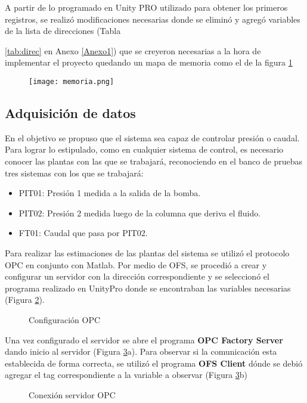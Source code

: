 
A partir de lo programado en Unity PRO utilizado para obtener los primeros registros, se realizó modificaciones necesarias donde se eliminó y agregó variables de la lista de direcciones (Tabla {\ref{tab:direc} en Anexo \ref{Anexo1}) que se creyeron necesarias a la hora de implementar el proyecto quedando un mapa de memoria como el de la figura \ref{fig:memoria}
\begin{figure}[h!]
	\centering
	\texttt{[image: memoria.png]}
	\label{fig:memoria}
\end{figure}


\subsection{Adquisición de datos}
En el objetivo se propuso que el sistema sea capaz de controlar presión o caudal. Para lograr lo estipulado, como en cualquier sistema de control, es necesario conocer las plantas con las que se trabajará, reconociendo en el banco de pruebas tres sistemas con los que se trabajará:
\begin{itemize}
	\item PIT01: Presión 1 medida a la salida de la bomba.
	\item PIT02: Presión 2 medida luego de la columna que deriva el fluido.
	\item FT01: Caudal que pasa por PIT02.
\end{itemize}
Para realizar las estimaciones de las plantas del sistema se utilizó el protocolo OPC en conjunto con Matlab. Por medio de OFS, se procedió a crear y configurar un servidor con la dirección correspondiente y se seleccionó el programa realizado en UnityPro donde se encontraban las variables necesarias (Figura \ref{fig:opc1}).

\begin{figure}[htbp]
	\centering
	\caption{Configuración OPC} \label{fig:opc1}
\end{figure}


Una vez configurado el servidor se abre el programa \textbf{OPC Factory Server} dando inicio al servidor (Figura \ref{fig:opc2}a). Para observar si la comunicación esta establecida de forma correcta, se utilizó el programa \textbf{OFS Client} dónde se debió agregar el tag correspondiente a la variable a observar (Figura \ref{fig:opc2}b)

\begin{figure}[htbp]
	\centering
	\caption{Conexión servidor OPC} \label{fig:opc2}
\end{figure}

}
